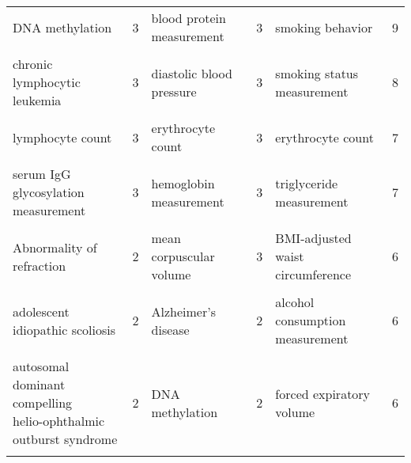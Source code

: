\begin{table}[!htbp]
{\begin{tabular}[t]{lrlrlr}
DNA methylation & 3 & blood protein measurement & 3 & smoking behavior & 9\\
\cellcolor{gray!6}{balding measurement} & \cellcolor{gray!6}{3} & \cellcolor{gray!6}{breast carcinoma} & \cellcolor{gray!6}{3} & \cellcolor{gray!6}{type II diabetes mellitus} & \cellcolor{gray!6}{9}\\
chronic lymphocytic leukemia & 3 & diastolic blood pressure & 3 & smoking status measurement & 8\\
\cellcolor{gray!6}{leukocyte count} & \cellcolor{gray!6}{3} & \cellcolor{gray!6}{eosinophil count} & \cellcolor{gray!6}{3} & \cellcolor{gray!6}{cognitive function measurement} & \cellcolor{gray!6}{7}\\
lymphocyte count & 3 & erythrocyte count & 3 & erythrocyte count & 7\\
\cellcolor{gray!6}{mean corpuscular hemoglobin} & \cellcolor{gray!6}{3} & \cellcolor{gray!6}{gut microbiome measurement} & \cellcolor{gray!6}{3} & \cellcolor{gray!6}{gut microbiome measurement} & \cellcolor{gray!6}{7}\\
serum IgG glycosylation measurement & 3 & hemoglobin measurement & 3 & triglyceride measurement & 7\\
\cellcolor{gray!6}{unipolar depression} & \cellcolor{gray!6}{3} & \cellcolor{gray!6}{hypertension} & \cellcolor{gray!6}{3} & \cellcolor{gray!6}{Alzheimer's disease} & \cellcolor{gray!6}{6}\\
Abnormality of refraction & 2 & mean corpuscular volume & 3 & BMI-adjusted waist circumference & 6\\
\cellcolor{gray!6}{Alzheimer's disease} & \cellcolor{gray!6}{2} & \cellcolor{gray!6}{waist-hip ratio} & \cellcolor{gray!6}{3} & \cellcolor{gray!6}{DNA methylation} & \cellcolor{gray!6}{6}\\
adolescent idiopathic scoliosis & 2 & Alzheimer's disease & 2 & alcohol consumption measurement & 6\\
\cellcolor{gray!6}{arterial stiffness measurement} & \cellcolor{gray!6}{2} & \cellcolor{gray!6}{BMI-adjusted waist-hip ratio} & \cellcolor{gray!6}{2} & \cellcolor{gray!6}{bipolar disorder} & \cellcolor{gray!6}{6}\\
\makecell[l]{autosomal dominant compelling \\ helio-ophthalmic outburst syndrome} & 2 & DNA methylation & 2 & forced expiratory volume & 6\\
\cellcolor{gray!6}{bipolar disorder} & \cellcolor{gray!6}{2} & \cellcolor{gray!6}{alcohol drinking} & \cellcolor{gray!6}{2} & \cellcolor{gray!6}{heel bone mineral density} & \cellcolor{gray!6}{6}\\

\end{tabular}}
\end{table}
